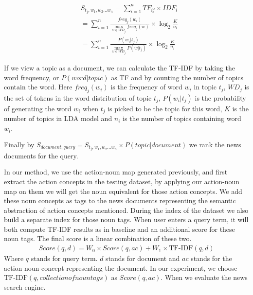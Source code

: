 \begin{align}
    & S_{t_j, w_1, w_2 ... w_n} =   \sum_{i=1}^n TF_{ij} \times IDF_i \\
    & = \sum_{i=1}^n \frac{freq_{j}(w_i)}{\max \limits_{w \in WD_j} freq_{j}(w) } \times \log_{2}\frac{K}{n_i} \\
    & = \sum_{i=1}^n  \frac{P(w_i|t_j)}{\max \limits_{w \in WD_j}P(w|t_j)} \times \log_{2}\frac{K}{n_i}
  \end{align}

If we view a topic as a document, we can calculate the TF-IDF by taking the word frequency, or $P(word|topic)$ as TF and by counting the number of topics contain the word. Here $freq_{j}(w_i)$ is the frequency of word $w_i$ in topic $t_j$, $WD_j$ is the set of tokens in the word distribution of topic $t_j$,  $P(w_i|t_j)$ is the probability of generating the word $w_i$ when $t_j$ is picked to be the topic for this word, $K$ is the number of topics in LDA model and $n_i$ is the number of topics containing word $w_i$.

Finally by $S_{document,query} = S_{t_j, w_1, w_2 ... w_n} \times P(topic | document)$ we rank the news documents for the query.

In our method, we use the action-noun map generated previously, and first extract the action concepts in the testing dataset,
by applying our action-noun map on them we will get the noun equivalent for those action concepts. We add these noun concepts as
tags to the news documents representing the semantic abstraction of action concepts mentioned. During the index of the dataset we also
build a separate index for those noun tags. When user enters a query term, it will both compute TF-IDF results as in baseline and
an additional score for these noun tags. The final score is a linear combination of these two.
\begin{align}
Score(q, d) = W_0 \times Score(q, ac) + W_1 \times \text{TF-IDF}(q, d)
\end{align}
Where $q$ stands for query term. $d$ stands for document and $ac$ stands for the action noun concept representing the document. In our experiment, we choose $\text{TF-IDF}(q, collection of noun tags)$ as $Score(q, ac)$.
When we evaluate the news search engine.

